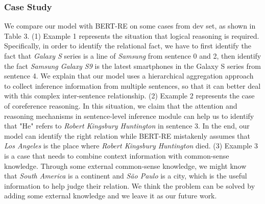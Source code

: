 \documentclass[runningheads]{llncs}
\makeatletter
\newcommand{\tabincell}[2]{\begin{tabular}{@{}#1@{}}#2\end{tabular}}
\makeatother
\begin{document}
\subsubsection{Case Study}
We compare our model with BERT-RE on some cases from dev set, as shown in Table 3.
(1) Example 1 represents the situation that logical reasoning is required.
Specifically, in order to identify the relational fact,
we have to first identify the fact that \emph{Galaxy S} series is a line of \emph{Samsung} from sentence 0 and 2,
then identify the fact \emph{Samsung Galaxy S9} is the latest smartphones in the Galaxy S series from sentence 4.
We explain that our model uses a hierarchical aggregation approach to collect inference information from multiple sentences, so that it can better deal with this complex inter-sentence relationship.
(2) Example 2 represents the case of coreference reasoning.
In this situation, we claim that the attention and reasoning mechanisms in sentence-level inference module can help us to identify that "He" refers to \emph{Robert Kingsbury Huntington} in sentence 3.
In the end, our model can identify the right relation while BERT-RE mistakenly assumes that \emph{Los Angeles} is the place where \emph{Robert Kingsbury Huntington} died.
(3) Example 3 is a case that needs to combine context information with common-sense knowledge.
Through some external common-sense knowledge, we might know that \emph{South America} is a continent and \emph{São Paulo} is a city, which is the useful information to help judge their relation.
We think the problem can be solved by adding some external knowledge and we leave it as our future work.
\end{document}
